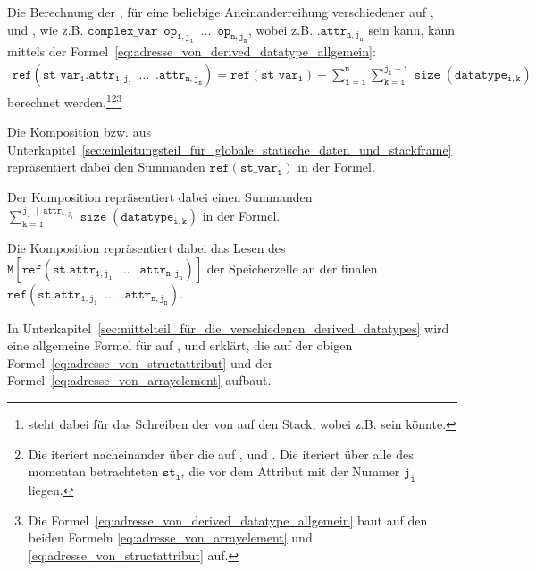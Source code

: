 \begin{Special_Paragraph}
Die Berechnung der , für eine beliebige Aneinanderreihung verschiedener  auf ,  und , wie z.B. $\mathtt{complex\_var\enspace op_{1, j_1}\enspace\ldots\enspace op_{n, j_n}}$, wobei z.B. $\mathtt{.attr_{n, j_n}}$ sein kann, kann mittels der Formel~\ref{eq:adresse_von_derived_datatype_allgemein}:
  \begin{gather}
    \mathtt{ref(st\_var_1.attr_{1, j_1}\enspace\ldots\enspace .attr_{n, j_n}) = ref(st\_var_1) + \sum_{i=1}^{n}\sum_{k=1}^{j_i - 1} \operatorname{size}(datatype_{i, k})}
  \label{eq:adresse_von_derived_datatype_allgemein}
  \end{gather}
berechnet werden.\footnote{ steht dabei für das Schreiben der  von  auf den Stack, wobei  z.B.  sein könnte.}\footnote{Die  iteriert nacheinander über die  auf ,  und . Die  iteriert über alle  des momentan betrachteten  $\mathtt{st_i}$, die vor dem Attribut mit der Nummer $\mathtt{j_i}$ liegen.}\footnote{Die Formel~\ref{eq:adresse_von_derived_datatype_allgemein} baut auf den beiden Formeln \ref{eq:adresse_von_arrayelement} und \ref{eq:adresse_von_structattribut} auf.}

Die Komposition  bzw.  aus Unterkapitel~\ref{sec:einleitungsteil_für_globale_statische_daten_und_stackframe} repräsentiert dabei den Summanden $\mathtt{ref(st\_var_1)}$ in der Formel.

  Der Komposition  repräsentiert dabei einen Summanden $\mathtt{\sum_{k=1}^{j_i\;\mid\; attr_{i,j_i}} \operatorname{size}(datatype_{i, k})}$ in der Formel.

Die Komposition  repräsentiert dabei das Lesen des  $\mathtt{M\left[ref(st.attr_{1, j_1}\enspace\ldots\enspace .attr_{n, j_n})\right]}$ der Speicherzelle an der finalen   $\mathtt{ref(st.attr_{1, j_1}\enspace\ldots\enspace .attr_{n, j_n})}$.

In Unterkapitel~\ref{sec:mittelteil_für_die_verschiedenen_derived_datatypes} wird eine allgemeine Formel für  auf ,  und  erklärt, die auf der obigen Formel~\ref{eq:adresse_von_structattribut} und der Formel~\ref{eq:adresse_von_arrayelement} aufbaut.
\end{Special_Paragraph}

